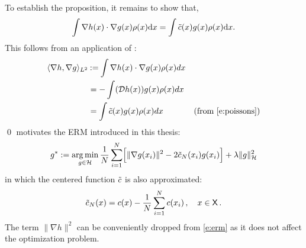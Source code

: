 To establish the proposition, it remains to show that,
\[
\int \nabla h(x) \cdot \nabla g(x) \pr(x) \ud x = \int \tilc(x) g(x) \pr(x) \ud x.
\label{e:transform}
\]
This follows from an application of :
\[
\begin{aligned}
\langle \nabla h, \nabla g \rangle_{L^2} & \mathbin{:=} \int \nabla h(x) \cdot \nabla g(x) \rho(x) dx \\
& = - \int  ({\cal D} h(x)) g(x) \rho(x) dx \\
& = \int \tilde c(x) g(x) \rho(x) dx \qquad & \text{(from \eqref{e:poissons})}
\end{aligned}
\]
\qed
{} motivates the ERM introduced in this thesis:	
\begin{equation}
g^*  := \argmin_{g \in \clH} \frac{1}{N} \sum_{i=1}^N\Bigl[ \| \nabla g(x_i) \|^2 - 2 \tilc_N(x_i)g(x_i)\Bigr] + \lambda \|g\|^2_\clH
\label{e:erm}
\end{equation}
in which the centered function $\tilde c$ is also approximated:
\[
\tilc_N(x) = c(x) - \frac{1}{N}  \sum_{i=1}^N  c(x_i)\,,\quad x\in\state\, .
\label{e:tlcApprox}
\]
The term $\| \nabla h \|^2$ can be conveniently dropped from \eqref{e:erm} as it does not affect the optimization problem.


